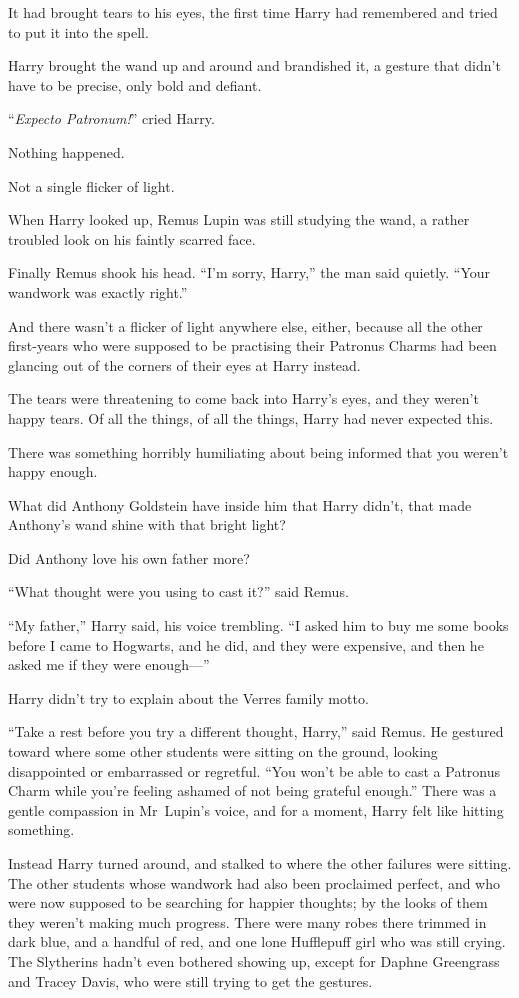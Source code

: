 It had brought tears to his eyes, the first time Harry had remembered and tried to put it into the spell.

Harry brought the wand up and around and brandished it, a gesture that didn’t have to be precise, only bold and defiant.

“\emph{Expecto Patronum!}” cried Harry.

Nothing happened.

Not a single flicker of light.

When Harry looked up, Remus Lupin was still studying the wand, a rather troubled look on his faintly scarred face.

Finally Remus shook his head. “I’m sorry, Harry,” the man said quietly. “Your wandwork was exactly right.”

And there wasn’t a flicker of light anywhere else, either, because all the other first-years who were supposed to be practising their Patronus Charms had been glancing out of the corners of their eyes at Harry instead.

The tears were threatening to come back into Harry’s eyes, and they weren’t happy tears. Of all the things, of all the things, Harry had never expected this.

There was something horribly humiliating about being informed that you weren’t happy enough.

What did Anthony Goldstein have inside him that Harry didn’t, that made Anthony’s wand shine with that bright light?

Did Anthony love his own father more?

“What thought were you using to cast it?” said Remus.

“My father,” Harry said, his voice trembling. “I asked him to buy me some books before I came to Hogwarts, and he did, and they were expensive, and then he asked me if they were enough—”

Harry didn’t try to explain about the Verres family motto.

“Take a rest before you try a different thought, Harry,” said Remus. He gestured toward where some other students were sitting on the ground, looking disappointed or embarrassed or regretful. “You won’t be able to cast a Patronus Charm while you’re feeling ashamed of not being grateful enough.” There was a gentle compassion in Mr~Lupin’s voice, and for a moment, Harry felt like hitting something.

Instead Harry turned around, and stalked to where the other failures were sitting. The other students whose wandwork had also been proclaimed perfect, and who were now supposed to be searching for happier thoughts; by the looks of them they weren’t making much progress. There were many robes there trimmed in dark blue, and a handful of red, and one lone Hufflepuff girl who was still crying. The Slytherins hadn’t even bothered showing up, except for Daphne Greengrass and Tracey Davis, who were still trying to get the gestures.

